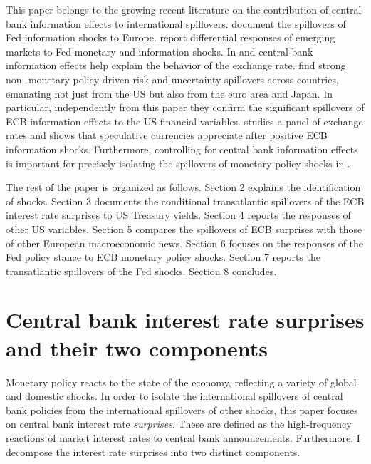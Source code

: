 \documentclass[a4paper,12pt]{article}
\begin{document}
This paper belongs to the growing recent literature on the contribution of central bank information effects to international spillovers. 
\cite{CesaBianchi_Sokol_2022} document the spillovers of Fed information shocks to Europe.
\cite{Hoek_etal_2022} report differential responses of emerging markets to Fed monetary and information shocks.
In \cite{Stavrakeva_Tang_2021} and \cite{Gurkaynak_etal_2021} central bank information effects help explain the behavior of the exchange rate. \cite{Bekaert_Hoerova_Xu_2020} find strong non-
monetary policy-driven risk and uncertainty spillovers across countries, emanating not just from the US but also from the euro area and Japan. In particular, independently from this paper they confirm the significant spillovers of ECB information effects to the US financial variables. 
\cite{Franz_2020} studies a panel of exchange rates and shows that speculative currencies appreciate after positive ECB information shocks. Furthermore, controlling for central bank information effects is important for precisely isolating the spillovers of monetary policy shocks in \cite{Cazorzi_etal_2020,MirandaAgrippino_Rey_2020,Corsetti_etal_2021,MirandaAgrippino_Nenova_2021}.

The rest of the paper is organized as follows. Section 2 explains the identification of shocks.
Section 3 documents the conditional transatlantic spillovers of the ECB interest rate surprises to US Treasury yields.
Section 4 reports the responses of other US variables.
Section 5 compares the spillovers of ECB surprises with those of other European macroeconomic news.
Section 6 focuses on the responses of the Fed policy stance to ECB monetary policy shocks.
Section 7 reports the transatlantic spillovers of the Fed shocks.
Section 8 concludes.

\section{Central bank interest rate surprises and their two components}\label{sec: surprises}

Monetary policy reacts to the state of the economy, reflecting a variety of global and
domestic shocks. In order to isolate the international spillovers of central bank policies
from the international spillovers of other shocks, this paper focuses on central bank interest rate \emph{surprises}. 
These are defined as the high-frequency reactions of market interest rates to central bank announcements.
Furthermore, I decompose the interest rate surprises into two distinct components.
\end{document}
